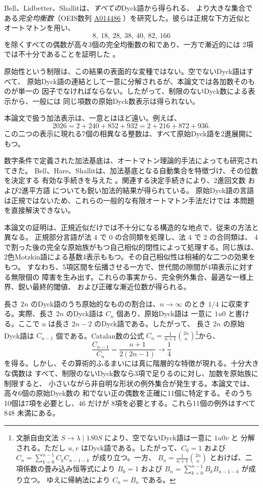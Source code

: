 \documentclass[12pt]{ltjsarticle}
\theoremstyle{plain}
\theoremstyle{definition}
\theoremstyle{plain}
\newcommand{\seqnum}[1]{\href{https://oeis.org/#1}{\textrm{\underline{#1}}}}
\begin{document}
Bell、Lidbetter、Shallitは、\emph{すべての}Dyck語から得られる、
より大きな集合である\emph{完全均衡数}（OEIS数列
\seqnum{A014486} \cite{OEIS-A014486}）を研究した。彼らは正規な下方近似と
オートマトンを用い、
\[
        8,\ 18,\ 28,\ 38,\ 40,\ 82,\ 166
\]
を除くすべての偶数が高々3個の完全均衡数の和であり、一方で漸近的には
2項では不十分であることを証明した \cite[Thm.\ 14]{BLS}。

原始性という制限は、この結果の表面的な変種ではない。空でないDyck語はすべて、
原始Dyck語の連結として一意に分解されるが、本論文では各加数そのものが単一の
因子でなければならない。したがって、制限のないDyck数による表示から、一般には
同じ項数の原始Dyck数表示は得られない。

本論文で扱う加法表示は、一意とはほど遠い。例えば、
\[
 2026=2+240+852+932=2+216+872+936.
\]
この二つの表示に現れる7個の相異なる整数は、すべて原始Dyck語を2進展開にもつ。

数字条件で定義された加法基底は、オートマトン理論的手法によっても研究されてきた。
Bell、Hare、Shallitは、加法基底となる自動集合を特徴づけ、その位数を決定する
有効な手続きを与えた \cite{BHS}。関連する決定手続きにより、2進回文数
\cite{RSS} および2進平方語 \cite{MNRS} についても鋭い加法的結果が得られている。
原始Dyck語の言語は正規ではないため、これらの一般的な有限オートマトン手法だけでは
本問題を直接解決できない。

本論文の証明は、正規近似だけでは不十分になる構造的な地点で、従来の方法と異なる。
正規部分言語が法 $4$ で $0$ の合同類を処理し、法 $4$ で $2$ の合同類は、
$4$ で割った後の完全な原始族がもつ自己相似的閉性によって処理する。同じ族は、
2色Motzkin語による基数4表示ももつ。その自己相似性は相補的な二つの効果をもつ。
すなわち、5項区間を伝播させる一方で、世代間の隙間が4項表示に対する無限個の
障害を生み出す。これらの事実から、完全例外集合、最適な一様上界、鋭い最終的閾値、
および正確な漸近位数が得られる。

長さ $2n$ のDyck語のうち原始的なものの割合は、$n\to\infty$ のとき
$1/4$ に収束する。実際、長さ $2n$ のDyck語は $C_n$ 個あり、原始Dyck語は
一意に $1u0$ と書ける。ここで $u$ は長さ $2n-2$ のDyck語である。したがって、
長さ $2n$ の原始Dyck語は $C_{n-1}$ 個である。Catalan数の公式
$C_n=\frac1{n+1}\binom{2n}{n}$\footnote{文脈自由文法
$S\to\lambda\mid 1S0S$ により、空でないDyck語は一意に $1u0v$ と
分解される。ただし $u,v$ はDyck語である。したがって、$C_0=1$ および
$C_n=\sum_{k=0}^{n-1}C_kC_{n-1-k}$ が成り立つ。一方、
$B_n=\frac{1}{n+1}\binom{2n}{n}$ とおけば、二項係数の畳み込み恒等式により
$B_0=1$ および $B_n=\sum_{k=0}^{n-1}B_kB_{n-1-k}$ が成り立つ。
ゆえに帰納法により $C_n=B_n$ である。}から、
\[
 \frac{C_{n-1}}{C_n}=\frac{n+1}{2(2n-1)}\longrightarrow\frac14
\]
を得る。しかし、その算術的ふるまいには真に階層的な特徴が現れる。十分大きな偶数は
すべて、制限のないDyck数なら3項で足りるのに対し、加数を原始族に制限すると、
小さいながら非自明な形状の例外集合が発生する。本論文では、高々6個の原始Dyck数の
和でない正の偶数を正確に11個に特定する。そのうち10個は7項を必要とし、$46$ だけが
8項を必要とする。これら11個の例外はすべて $848$ 未満にある。
\end{document}
